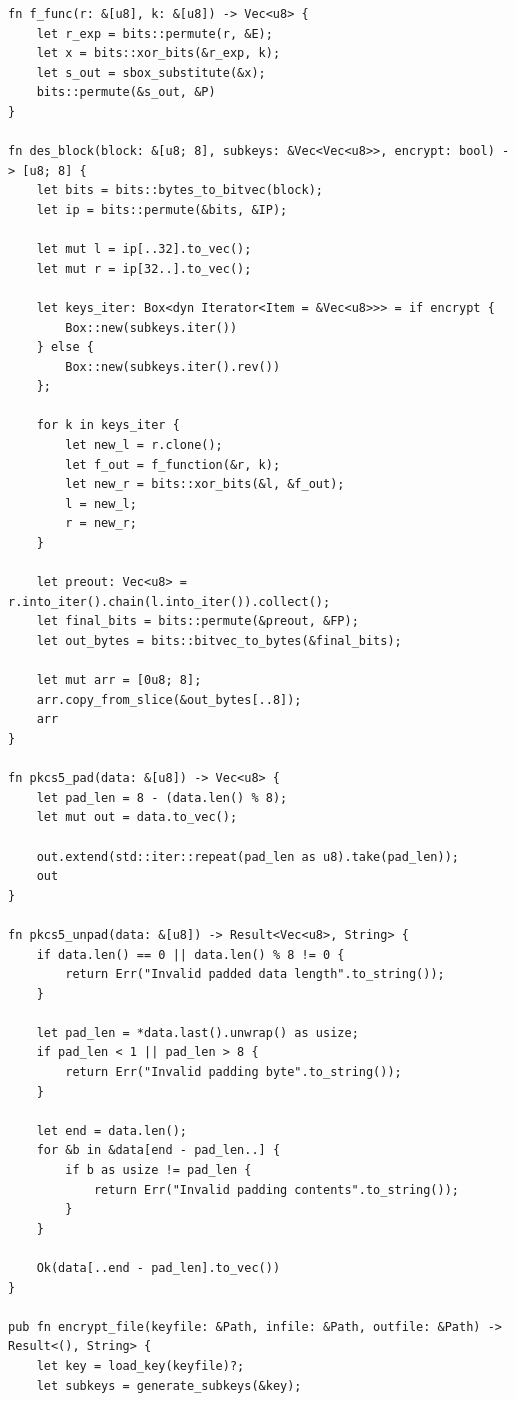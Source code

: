 \begin{center}
\captionsetup{justification=raggedright,singlelinecheck=off}
\begin{lstlisting}[label=lst:edcrypt,caption=Шифрование/расшифровка алгоритмом RSA]
fn f_func(r: &[u8], k: &[u8]) -> Vec<u8> {
    let r_exp = bits::permute(r, &E);
    let x = bits::xor_bits(&r_exp, k);
    let s_out = sbox_substitute(&x);
    bits::permute(&s_out, &P)
}

fn des_block(block: &[u8; 8], subkeys: &Vec<Vec<u8>>, encrypt: bool) -> [u8; 8] {
    let bits = bits::bytes_to_bitvec(block);
    let ip = bits::permute(&bits, &IP);

    let mut l = ip[..32].to_vec();
    let mut r = ip[32..].to_vec();

    let keys_iter: Box<dyn Iterator<Item = &Vec<u8>>> = if encrypt {
        Box::new(subkeys.iter())
    } else {
        Box::new(subkeys.iter().rev())
    };

    for k in keys_iter {
        let new_l = r.clone();
        let f_out = f_function(&r, k);
        let new_r = bits::xor_bits(&l, &f_out);
        l = new_l;
        r = new_r;
    }

    let preout: Vec<u8> = r.into_iter().chain(l.into_iter()).collect();
    let final_bits = bits::permute(&preout, &FP);
    let out_bytes = bits::bitvec_to_bytes(&final_bits);

    let mut arr = [0u8; 8];
    arr.copy_from_slice(&out_bytes[..8]);
    arr
}

fn pkcs5_pad(data: &[u8]) -> Vec<u8> {
    let pad_len = 8 - (data.len() % 8);
    let mut out = data.to_vec();

    out.extend(std::iter::repeat(pad_len as u8).take(pad_len));
    out
}

fn pkcs5_unpad(data: &[u8]) -> Result<Vec<u8>, String> {
    if data.len() == 0 || data.len() % 8 != 0 {
        return Err("Invalid padded data length".to_string());
    }

    let pad_len = *data.last().unwrap() as usize;
    if pad_len < 1 || pad_len > 8 {
        return Err("Invalid padding byte".to_string());
    }

    let end = data.len();
    for &b in &data[end - pad_len..] {
        if b as usize != pad_len {
            return Err("Invalid padding contents".to_string());
        }
    }

    Ok(data[..end - pad_len].to_vec())
}

pub fn encrypt_file(keyfile: &Path, infile: &Path, outfile: &Path) -> Result<(), String> {
    let key = load_key(keyfile)?;
    let subkeys = generate_subkeys(&key);


\end{lstlisting}
\end{center}
